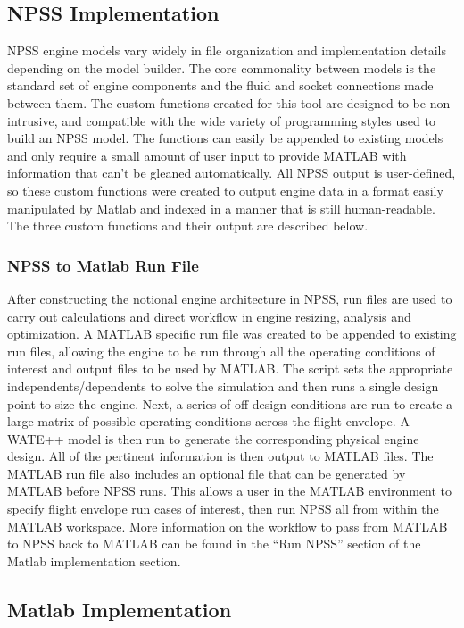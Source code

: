 \documentclass[heading.tex]{subfiles}
\begin{document}
\subsection{NPSS Implementation}

NPSS engine models vary widely in file organization and implementation details depending on the
model builder. The core commonality between models is the standard set of engine components and
the fluid and socket connections made between them. The custom functions created for this tool are
designed to be non-intrusive, and compatible with the wide variety of programming styles used to
build an NPSS model. The functions can easily be appended to existing models and only require a
small amount of user input to provide MATLAB with information that can’t be gleaned automatically.
All NPSS output is user-defined, so these custom functions were created to output engine data in a
format easily manipulated by Matlab and indexed in a manner that is still human-readable. The
three custom functions and their output are described below.

\subsubsection{NPSS to Matlab Run File}

After constructing the notional engine architecture in NPSS, run files are used to carry out
calculations and direct workflow in engine resizing, analysis and optimization. A MATLAB specific
run file was created to be appended to existing run files, allowing the engine to be run through
all the operating conditions of interest and output files to be used by MATLAB. The script sets
the appropriate independents/dependents to solve the simulation and then runs a single design
point to size the engine. Next, a series of off-design conditions are run to create a large matrix
of possible operating conditions across the flight envelope. A WATE++ model is then run to
generate the corresponding physical engine design. All of the pertinent information is then output
to MATLAB files. The MATLAB run file also includes an optional file that can be generated by
MATLAB before NPSS runs. This allows a user in the MATLAB environment to specify flight envelope
run cases of interest, then run NPSS all from within the MATLAB workspace. More information on the
workflow to pass from MATLAB to NPSS back to MATLAB can be found in the “Run NPSS” section of the
Matlab implementation section.

\subsection{Matlab Implementation}
\end{document}
